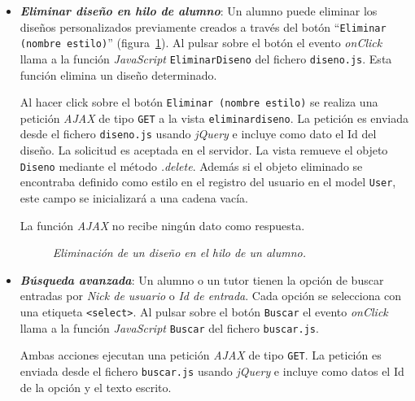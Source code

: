 \documentclass[a4paper, 12pt]{book}
\begin{document}
\begin{itemize}
  \item {\bfseries \textit{Eliminar dise\~no en hilo de alumno}}: Un alumno puede eliminar los dise\~nos personalizados previamente creados a trav\'es del 
  bot\'on ``\texttt{Eliminar (nombre estilo)}'' (figura~\ref{fig:elimdiseno}). Al pulsar sobre el bot\'on el evento \textit{onClick} llama a la funci\'on 
  \textit{JavaScript} \texttt{EliminarDiseno} del fichero \texttt{diseno.js}. Esta funci\'on elimina un dise\~no determinado.
  
  Al hacer click sobre el bot\'on \texttt{Eliminar (nombre estilo)} se realiza una petici\'on \textit{AJAX} de tipo \texttt{GET} a la vista 
  \texttt{eliminardiseno}. La petici\'on es enviada desde el fichero \texttt{diseno.js} usando \textit{jQuery} e incluye como dato el 
  Id del dise\~no. La solicitud es aceptada en el servidor. La vista remueve el objeto \texttt{Diseno} mediante el m\'etodo 
  \textit{.delete}. Adem\'as si el objeto eliminado se encontraba definido como estilo en el registro del usuario en el model \texttt{User}, este campo se 
  inicializar\'a a una cadena vac\'ia.
  
  La funci\'on \textit{AJAX} no recibe ning\'un dato como respuesta.
  
  \begin{figure}
    \centering
    \caption{\textit{Eliminaci\'on de un dise\~no en el hilo de un alumno.}}
    \label{fig:elimdiseno}
  \end{figure}
  
  \item {\bfseries \textit{B\'usqueda avanzada}}: Un alumno o un tutor tienen la opci\'on de buscar entradas por \textit{Nick de usuario} o 
  \textit{Id de entrada}. Cada opci\'on se selecciona con una etiqueta \texttt{<select>}. Al pulsar sobre el bot\'on \texttt{Buscar} el evento 
  \textit{onClick} llama a la funci\'on \textit{JavaScript} \texttt{Buscar} del fichero \texttt{buscar.js}. 
  
  Ambas acciones ejecutan una petici\'on \textit{AJAX} de tipo \texttt{GET}. La petici\'on es enviada desde el fichero \texttt{buscar.js} usando 
  \textit{jQuery} e incluye como datos el Id de la opci\'on y el texto escrito.


\end{itemize}
\end{document}
